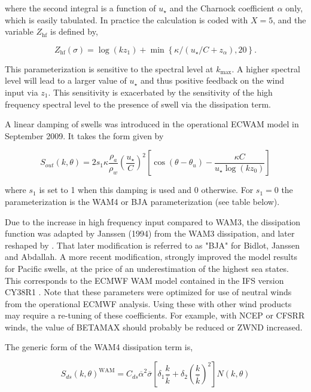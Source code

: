 \noindent
where the second integral is a function of $u_\star$ and the Charnock
coefficient $\alpha$ only, which is easily tabulated. In practice the
calculation is coded with $X=5$, and the variable $Z_{\mathrm{hf}}$ is defined
by,

\begin{equation}
Z_{\mathrm{hf}}(\sigma)=\log(k z_1)+\min\left\{\kappa/\left(u_\star/C +
z_\alpha \right),20\right\}.
\end{equation}

\noindent
This parameterization is sensitive to the spectral level at $k_{\max}$.
A higher spectral level will lead to a larger value of $u_\star$ and thus
positive feedback on the wind input via $z_1$. This sensitivity is exacerbated
by the sensitivity of the high frequency spectral level to the presence of
swell via the dissipation term.

A linear damping of swells was introduced in the operational ECWAM model in September 2009. It takes 
the form given by \cite{bk:Jan04} 

\begin{equation}
S_{out}(k,\theta)= 2 s_1  \kappa \frac{\rho_a }{\rho_w} \left(\frac{u_\star}{C}\right)^2 
\left[\cos \left(\theta - \theta_u\right) - \frac{\kappa C}{u_\star \log(k z_0)}\right]
\end{equation}

\noindent where $s_1$ is set to 1 when this damping is used and 0 otherwise. For $s_1=0$ 
the parameterization is the WAM4 or BJA parameterization (see table below). 

Due to the increase in high frequency input compared to WAM3, the dissipation
function was adapted by Janssen (1994) from the WAM3 dissipation, and later
reshaped by \cite{rep:Bea05}. That later modification is referred to as "BJA" for Bidlot, 
Janssen and Abdallah. A more recent modification, strongly improved the model results for 
Pacific swells, at the price of an underestimation of the highest sea states. This 
corresponds to the ECMWF WAM model contained in the IFS version CY38R1 \citep{pro:Bid12}. Note that these parameters were optimized for use of neutral winds from the 
operational ECMWF analysis. Using these with other wind products may require a re-tuning of these coefficients. For example, with NCEP or CFSRR winds, the value of BETAMAX 
should probably be reduced or ZWND increased. 

\noindent
The generic form of the WAM4 dissipation term is,

\begin{equation}
S_{ds}\left(k,\theta\right)^{\mathrm{WAM}} = C_{ds} \overline{\alpha}^2
 \overline{\sigma} \left[\delta_1 \frac{k}{\overline{k}} + \delta_2
\left(\frac{k}{\overline{k}}\right)^2\right]\label{eq:SdsWAM4}
N\left(k,\theta\right)
\end{equation}


